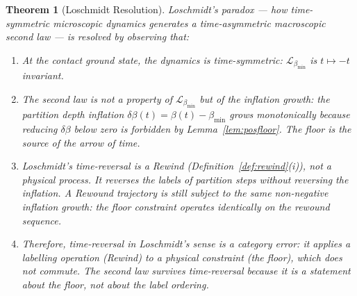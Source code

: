 \documentclass[11pt,twocolumn,a4paper]{article}
\theoremstyle{plain}
\newtheorem{theorem}{Theorem}[section]
\theoremstyle{definition}
\theoremstyle{remark}
\newcommand{\bmin}{\beta_{\min}}
\newcommand{\Lmin}{\mathcal{L}_{\bmin}}
\begin{document}
\begin{theorem}[Loschmidt Resolution]
\label{thm:loschmidt}
Loschmidt's paradox --- how time-symmetric microscopic dynamics generates a
time-asymmetric macroscopic second law --- is resolved by observing that:
\begin{enumerate}[label=(\roman*)]
  \item At the contact ground state, the dynamics \emph{is} time-symmetric:
  $\Lmin$ is $t \mapsto -t$ invariant.
  \item The second law is not a property of $\Lmin$ but of the inflation
  growth: the partition depth inflation $\delta\beta(t) = \beta(t) - \bmin$
  grows monotonically because reducing $\delta\beta$ below zero is forbidden
  by Lemma~\ref{lem:posfloor}. The floor is the source of the arrow of time.
  \item Loschmidt's time-reversal is a Rewind (Definition~\ref{def:rewind}(i)),
  not a physical process. It reverses the \emph{labels} of partition steps
  without reversing the inflation. A Rewound trajectory is still subject to
  the same non-negative inflation growth: the floor constraint operates
  identically on the rewound sequence.
  \item Therefore, time-reversal in Loschmidt's sense is a category error:
  it applies a labelling operation (Rewind) to a physical constraint (the
  floor), which does not commute. The second law survives time-reversal
  because it is a statement about the floor, not about the label ordering.
\end{enumerate}
\end{theorem}
\end{document}
